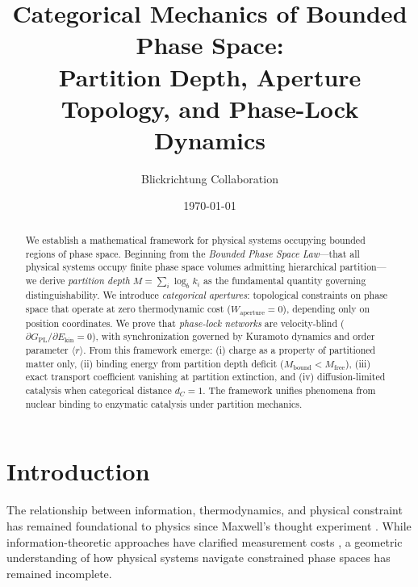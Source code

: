 \documentclass[twocolumn,amsmath,amssymb,aps,prl,superscriptaddress]{revtex4-2}
\newcommand{\Mpart}{M}
\newcommand{\Gfree}{G_{\text{PL}}}
\newcommand{\Ekin}{E_{\text{kin}}}
\newcommand{\Wapert}{W_{\text{aperture}}}
\newcommand{\orderp}{\langle r \rangle}
\begin{document}
\title{Categorical Mechanics of Bounded Phase Space: \\
Partition Depth, Aperture Topology, and Phase-Lock Dynamics}

\author{Blickrichtung Collaboration}

\date{\today}

\begin{abstract}
We establish a mathematical framework for physical systems occupying bounded regions of phase space. Beginning from the \emph{Bounded Phase Space Law}---that all physical systems occupy finite phase space volumes admitting hierarchical partition---we derive \emph{partition depth} $\Mpart = \sum_i \log_b k_i$ as the fundamental quantity governing distinguishability. We introduce \emph{categorical apertures}: topological constraints on phase space that operate at zero thermodynamic cost ($\Wapert = 0$), depending only on position coordinates. We prove that \emph{phase-lock networks} are velocity-blind ($\partial \Gfree / \partial \Ekin = 0$), with synchronization governed by Kuramoto dynamics and order parameter $\orderp$. From this framework emerge: (i) charge as a property of partitioned matter only, (ii) binding energy from partition depth deficit ($\Mpart_{\text{bound}} < \Mpart_{\text{free}}$), (iii) exact transport coefficient vanishing at partition extinction, and (iv) diffusion-limited catalysis when categorical distance $d_C = 1$. The framework unifies phenomena from nuclear binding to enzymatic catalysis under partition mechanics.
\end{abstract}

\maketitle

\section{Introduction}

The relationship between information, thermodynamics, and physical constraint has remained foundational to physics since Maxwell's thought experiment \cite{maxwell1871theory}. While information-theoretic approaches have clarified measurement costs \cite{landauer1961irreversibility,bennett1982thermodynamics}, a geometric understanding of how physical systems navigate constrained phase spaces has remained incomplete.
\end{document}
